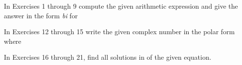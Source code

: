 \documentclass[11pt,oneside]{article}
\begin{document}
\BookNarrativefalse

\begin{BookBody}

 \BookEnd{\blacksquare}

\noindent In Exercises 1 through 9 compute the given arithmetic expression and give the answer in the form  \textit{bi} for 












\noindent In Exercises 12 through 15 write the given complex number  in the polar form  where 





\noindent In Exercises 16 through 21, find all solutions in  of the given equation.








\end{BookBody}
\end{document}
